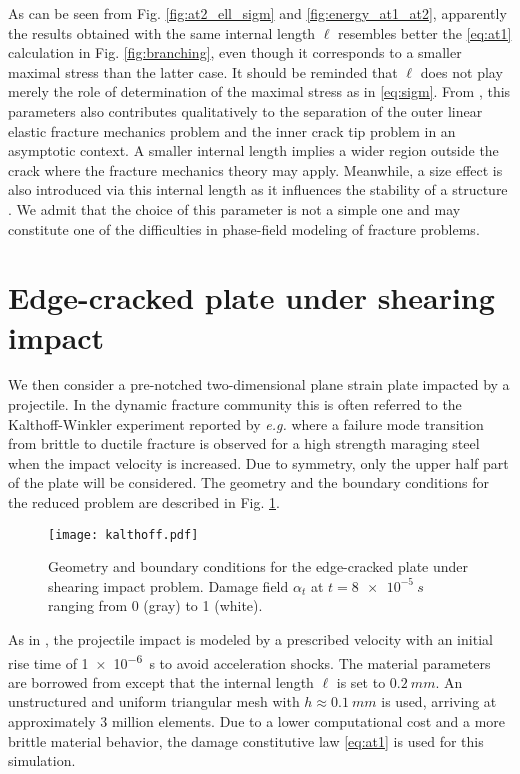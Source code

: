 As can be seen from Fig. \ref{fig:at2_ell_sigm} and \ref{fig:energy_at1_at2}, apparently the results obtained with the same internal length $\ell$ resembles better the \eqref{eq:at1} calculation in Fig. \ref{fig:branching}, even though it corresponds to a smaller maximal stress than the latter case. It should be reminded that $\ell$ does not play merely the role of determination of the maximal stress as in \eqref{eq:sigm}. From \cite{SicsicMarigo:2013}, this parameters also contributes qualitatively to the separation of the outer linear elastic fracture mechanics problem and the inner crack tip problem in an asymptotic context. A smaller internal length implies a wider region outside the crack where the fracture mechanics theory may apply. Meanwhile, a size effect is also introduced via this internal length as it influences the stability of a structure \cite{PhamMarigo:2013-1}. We admit that the choice of this parameter is not a simple one and may constitute one of the difficulties in phase-field modeling of fracture problems.

\section{Edge-cracked plate under shearing impact}
We then consider a pre-notched two-dimensional plane strain plate impacted by a projectile. In the dynamic fracture community this is often referred to the Kalthoff-Winkler experiment reported by \emph{e.g.} \cite{Kalthoff:2000} where a failure mode transition from brittle to ductile fracture is observed for a high strength maraging steel when the impact velocity is increased. Due to symmetry, only the upper half part of the plate will be considered. The geometry and the boundary conditions for the reduced problem are described in Fig. \ref{fig:kalthoff}.
\begin{figure}[htbp]
\centering
\texttt{[image: kalthoff.pdf]}
\caption{Geometry and boundary conditions for the edge-cracked plate under shearing impact problem. Damage field $\alpha_t$ at $t=\SI{8e-5}{s}$ ranging from 0 (gray) to 1 (white).} \label{fig:kalthoff}
\end{figure}
As in \cite{BordenVerhooselScottHughesLandis:2012,HofackerMiehe:2012}, the projectile impact is modeled by a prescribed velocity with an initial rise time of \SI{1e-6}{s} to avoid acceleration shocks. The material parameters are borrowed from \cite{BordenVerhooselScottHughesLandis:2012} except that the internal length $\ell$ is set to $\SI{0.2}{mm}$. An unstructured and uniform triangular mesh with $h\approx \SI{0.1}{mm}$ is used, arriving at approximately 3 million elements. Due to a lower computational cost and a more brittle material behavior, the damage constitutive law \eqref{eq:at1} is used for this simulation.

